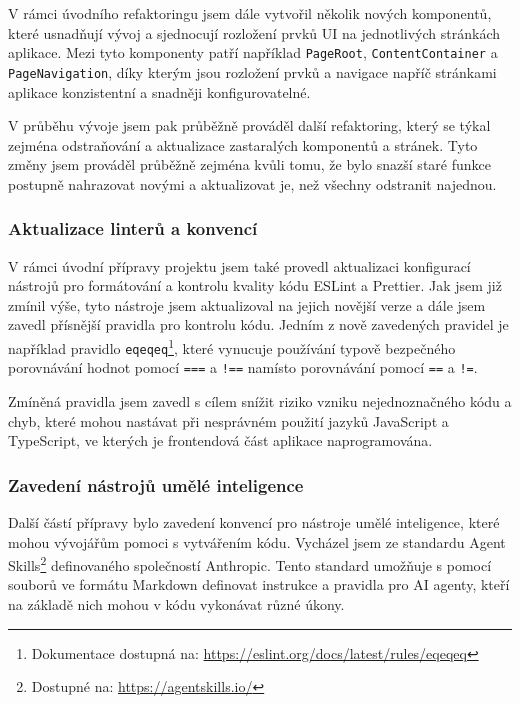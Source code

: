 V rámci úvodního refaktoringu jsem dále vytvořil několik nových komponentů, které usnadňují vývoj a sjednocují rozložení prvků UI na jednotlivých stránkách aplikace. Mezi tyto komponenty patří například \texttt{PageRoot}, \texttt{ContentContainer} a \texttt{PageNavigation}, díky kterým jsou rozložení prvků a navigace napříč stránkami aplikace konzistentní a snadněji konfigurovatelné.

V průběhu vývoje jsem pak průběžně prováděl další refaktoring, který se týkal zejména odstraňování a aktualizace zastaralých komponentů a stránek. Tyto změny jsem prováděl průběžně zejména kvůli tomu, že bylo snazší staré funkce postupně nahrazovat novými a aktualizovat je, než všechny odstranit najednou.

\subsubsection{Aktualizace linterů a konvencí}

V rámci úvodní přípravy projektu jsem také provedl aktualizaci konfigurací nástrojů pro formátování a kontrolu kvality kódu ESLint a Prettier. Jak jsem již zmínil výše, tyto nástroje jsem aktualizoval na jejich novější verze a dále jsem zavedl přísnější pravidla pro kontrolu kódu. Jedním z nově zavedených pravidel je například pravidlo \texttt{eqeqeq}\footnote{Dokumentace dostupná na: \href{https://eslint.org/docs/latest/rules/eqeqeq}{https://eslint.org/docs/latest/rules/eqeqeq}}, které vynucuje používání typově bezpečného porovnávání hodnot pomocí \texttt{===} a \texttt{!==} namísto porovnávání pomocí \texttt{==} a \texttt{!=}.

Zmíněná pravidla jsem zavedl s cílem snížit riziko vzniku nejednoznačného kódu a chyb, které mohou nastávat při nesprávném použití jazyků JavaScript a TypeScript, ve kterých je frontendová část aplikace naprogramována.

\subsubsection{Zavedení nástrojů umělé inteligence}

Další částí přípravy bylo zavedení konvencí pro nástroje umělé inteligence, které mohou vývojářům pomoci s vytvářením kódu. Vycházel jsem ze standardu Agent Skills\footnote{Dostupné na: \href{https://agentskills.io/}{https://agentskills.io/}} definovaného společností Anthropic. Tento standard umožňuje s pomocí souborů ve formátu Markdown definovat instrukce a pravidla pro AI agenty, kteří na základě nich mohou v kódu vykonávat různé úkony. \cite{AgentSkills}

